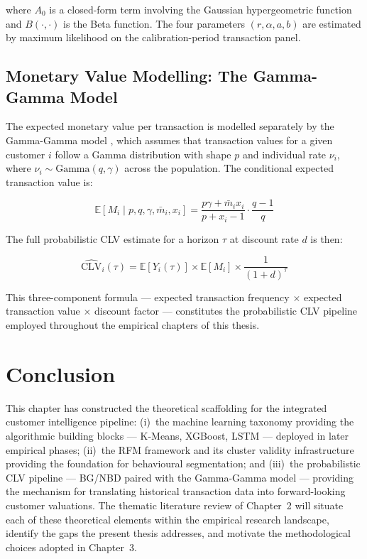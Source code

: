 where $A_0$ is a closed-form term involving the Gaussian hypergeometric function and $B(\cdot,\cdot)$ is the Beta function. The four parameters $(r, \alpha, a, b)$ are estimated by maximum likelihood on the calibration-period transaction panel.

\subsection{Monetary Value Modelling: The Gamma-Gamma Model}

The expected monetary value per transaction is modelled separately by the Gamma-Gamma model \cite{FaderHardie2013}, which assumes that transaction values for a given customer $i$ follow a Gamma distribution with shape $p$ and individual rate $\nu_i$, where $\nu_i \sim \text{Gamma}(q, \gamma)$ across the population. The conditional expected transaction value is:

\begin{equation}
    \mathbb{E}[M_i \mid p, q, \gamma, \bar{m}_i, x_i] = \frac{p\gamma + \bar{m}_i x_i}{p + x_i - 1} \cdot \frac{q-1}{q}
    \label{eq:gamma_gamma2}
\end{equation}

The full probabilistic CLV estimate for a horizon $\tau$ at discount rate $d$ is then:

\begin{equation}
    \widehat{\text{CLV}}_i(\tau) = \mathbb{E}[Y_i(\tau)] \times \mathbb{E}[M_i] \times \frac{1}{(1+d)^\tau}
    \label{eq:prob_clv}
\end{equation}

This three-component formula — expected transaction frequency $\times$ expected transaction value $\times$ discount factor — constitutes the probabilistic CLV pipeline employed throughout the empirical chapters of this thesis.

\section*{Conclusion}

This chapter has constructed the theoretical scaffolding for the integrated customer intelligence pipeline: (i)~the machine learning taxonomy providing the algorithmic building blocks — K-Means, XGBoost, LSTM — deployed in later empirical phases; (ii)~the RFM framework and its cluster validity infrastructure providing the foundation for behavioural segmentation; and (iii)~the probabilistic CLV pipeline — BG/NBD paired with the Gamma-Gamma model — providing the mechanism for translating historical transaction data into forward-looking customer valuations. The thematic literature review of Chapter~2 will situate each of these theoretical elements within the empirical research landscape, identify the gaps the present thesis addresses, and motivate the methodological choices adopted in Chapter~3.
